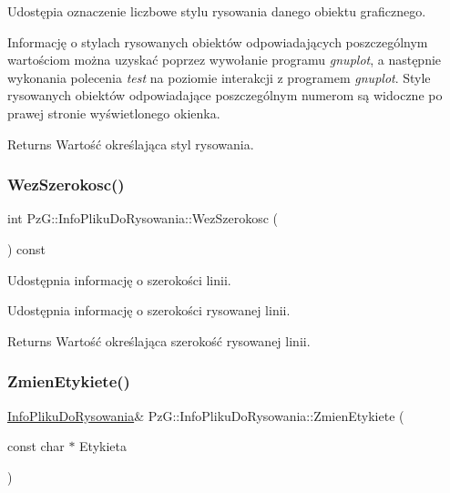 Udostępia oznaczenie liczbowe stylu rysowania danego obiektu graficznego.

Informację o stylach rysowanych obiektów odpowiadających poszczególnym wartościom można uzyskać poprzez wywołanie programu {\itshape gnuplot}, a następnie wykonania polecenia {\itshape test} na poziomie interakcji z programem {\itshape gnuplot}. Style rysowanych obiektów odpowiadające poszczególnym numerom są widoczne po prawej stronie wyświetlonego okienka. \begin{DoxyReturn}{Returns}
Wartość określająca styl rysowania. 
\end{DoxyReturn}
\mbox{\label{class_pz_g_1_1_info_pliku_do_rysowania_a627bb615c50f3b03374774e6b974488b}} 
\subsubsection{\texorpdfstring{WezSzerokosc()}{WezSzerokosc()}}
{\footnotesize\ttfamily int Pz\+G\+::\+Info\+Pliku\+Do\+Rysowania\+::\+Wez\+Szerokosc (\begin{DoxyParamCaption}{ }\end{DoxyParamCaption}) const\hspace{0.3cm}{\ttfamily [inline]}}



Udostępnia informację o szerokości linii. 

Udostępnia informację o szerokości rysowanej linii. \begin{DoxyReturn}{Returns}
Wartość określająca szerokość rysowanej linii. 
\end{DoxyReturn}
\mbox{\label{class_pz_g_1_1_info_pliku_do_rysowania_a1497c20c07dd13c716ff76d3cc4d7cf3}} 
\subsubsection{\texorpdfstring{ZmienEtykiete()}{ZmienEtykiete()}}
{\footnotesize\ttfamily \mbox{\hyperlink{class_pz_g_1_1_info_pliku_do_rysowania}{Info\+Pliku\+Do\+Rysowania}}\& Pz\+G\+::\+Info\+Pliku\+Do\+Rysowania\+::\+Zmien\+Etykiete (\begin{DoxyParamCaption}\item[{const char $\ast$}]{Etykieta }\end{DoxyParamCaption})\hspace{0.3cm}{\ttfamily [inline]}}



